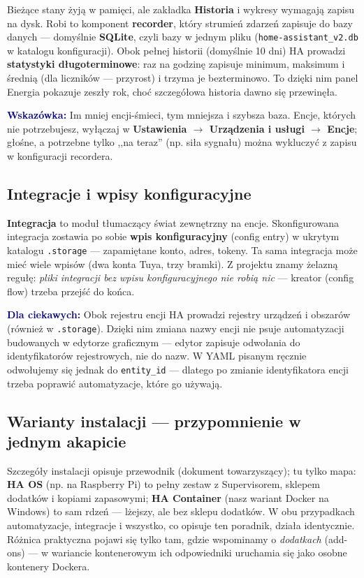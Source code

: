\documentclass[11pt,a4paper]{article}
\newcommand{\wskazowka}[1]{\par\medskip\noindent\textcolor{navy}{\textbf{Wskazówka:}} #1\par\medskip}
\newcommand{\ciekawostka}[1]{\par\medskip\noindent\textcolor{navy}{\textbf{Dla ciekawych:}} #1\par\medskip}
\begin{document}
Bieżące stany żyją w pamięci, ale zakładka \textbf{Historia} i wykresy wymagają zapisu na dysk. Robi to komponent \textbf{recorder}, który strumień zdarzeń zapisuje do bazy danych --- domyślnie \textbf{SQLite}, czyli bazy w jednym pliku (\texttt{home-assistant\_v2.db} w katalogu konfiguracji). Obok pełnej historii (domyślnie 10 dni) HA prowadzi \textbf{statystyki długoterminowe}: raz na godzinę zapisuje minimum, maksimum i średnią (dla liczników --- przyrost) i trzyma je bezterminowo. To dzięki nim panel Energia pokazuje zeszły rok, choć szczegółowa historia dawno się przewinęła.

\wskazowka{Im mniej encji-śmieci, tym mniejsza i szybsza baza. Encje, których nie potrzebujesz, wyłączaj w \textbf{Ustawienia $\to$ Urządzenia i usługi $\to$ Encje}; głośne, a potrzebne tylko ,,na teraz'' (np. siła sygnału) można wykluczyć z zapisu w konfiguracji recordera.}

\subsection{Integracje i wpisy konfiguracyjne}

\textbf{Integracja} to moduł tłumaczący świat zewnętrzny na encje. Skonfigurowana integracja zostawia po sobie \textbf{wpis konfiguracyjny} (config entry) w ukrytym katalogu \texttt{.storage} --- zapamiętane konto, adres, tokeny. Ta sama integracja może mieć wiele wpisów (dwa konta Tuya, trzy bramki). Z projektu znamy żelazną regułę: \emph{pliki integracji bez wpisu konfiguracyjnego nie robią nic} --- kreator (config flow) trzeba przejść do końca.

\ciekawostka{Obok rejestru encji HA prowadzi rejestry urządzeń i obszarów (również w \texttt{.storage}). Dzięki nim zmiana nazwy encji nie psuje automatyzacji budowanych w edytorze graficznym --- edytor zapisuje odwołania do identyfikatorów rejestrowych, nie do nazw. W YAML pisanym ręcznie odwołujemy się jednak do \texttt{entity\_id} --- dlatego po zmianie identyfikatora encji trzeba poprawić automatyzacje, które go używają.}

\subsection{Warianty instalacji --- przypomnienie w jednym akapicie}

Szczegóły instalacji opisuje przewodnik (dokument towarzyszący); tu tylko mapa: \textbf{HA OS} (np. na Raspberry Pi) to pełny zestaw z Supervisorem, sklepem dodatków i kopiami zapasowymi; \textbf{HA Container} (nasz wariant Docker na Windows) to sam rdzeń --- lżejszy, ale bez sklepu dodatków. W obu przypadkach automatyzacje, integracje i wszystko, co opisuje ten poradnik, działa identycznie. Różnica praktyczna pojawi się tylko tam, gdzie wspominamy o \emph{dodatkach} (add-ons) --- w wariancie kontenerowym ich odpowiedniki uruchamia się jako osobne kontenery Dockera.
\end{document}
